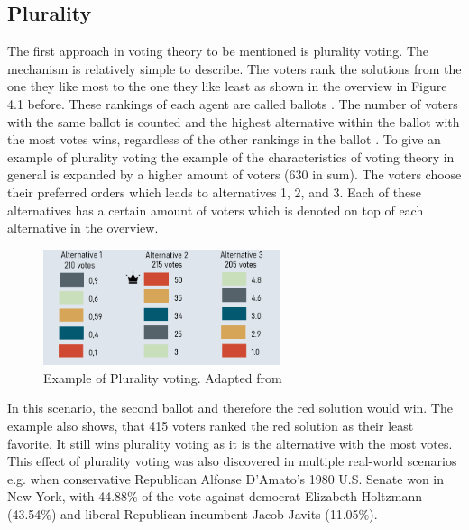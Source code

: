\documentclass[german, a4paper, 11pt, oneside]{scrbook}
\begin{document}
\subsection{Plurality}
The first approach in voting theory to be mentioned is plurality voting. The mechanism is relatively simple to describe. The voters rank the solutions from the one they like most to the one they like least as shown in the overview in Figure 4.1 before. These rankings of each agent are called ballots \cite{Brandt}. The number of voters with the same ballot is counted and the highest alternative within the ballot with the most votes wins, regardless of the other rankings in the ballot \cite{Brandt}. To give an example of plurality voting the example of the characteristics of voting theory in general is expanded by a higher amount of voters (630 in sum). The voters choose their preferred orders which leads to alternatives 1, 2, and 3. Each of these alternatives has a certain amount of voters which is denoted on top of each alternative in the overview.
\begin{figure}[h]
\centering
\includegraphics[height=3.4cm]{Plurality}
\caption{Example of Plurality voting. Adapted from \cite{Brandt}}
\end{figure}
In this scenario, the second ballot and therefore the red solution would win. The example also shows, that 415 voters ranked the red solution as their least favorite. It still wins plurality voting as it is the alternative with the most votes.
\\
This effect of plurality voting was also discovered in multiple real-world scenarios e.g. when conservative Republican Alfonse D’Amato’s 1980 U.S. Senate won in New York, with 44.88\% of the vote against democrat Elizabeth Holtzmann (43.54\%) and liberal Republican incumbent Jacob Javits (11.05\%).\cite{Brandt}
\end{document}
